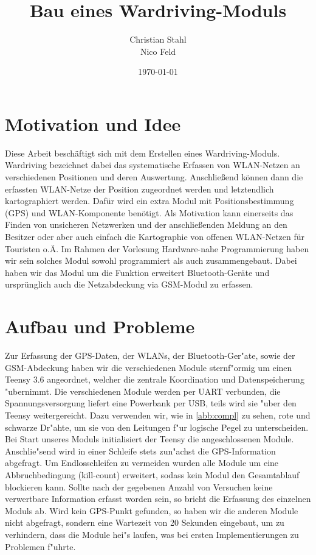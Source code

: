 \documentclass[a4paper,11pt, ngerman]{scrartcl}
\author{Christian Stahl\\Nico Feld}
\title{Bau eines Wardriving-Moduls}
\date{\today}
\begin{document}
\maketitle
\pagebreak
{}
\tableofcontents
\pagebreak
\section{Motivation und Idee}
Diese Arbeit beschäftigt sich mit dem Erstellen eines Wardriving-Moduls. \grqq Wardriving\grqq{} bezeichnet dabei das systematische Erfassen von WLAN-Netzen an verschiedenen Positionen und deren Auswertung. Anschließend können dann die erfassten WLAN-Netze der Position zugeordnet werden und letztendlich kartographiert werden. Dafür wird ein extra Modul mit Positionsbestimmung (GPS) und WLAN-Komponente benötigt. Als Motivation kann einerseits das Finden von unsicheren Netzwerken und der anschließenden Meldung an den Besitzer oder aber auch einfach die Kartographie von offenen WLAN-Netzen für Touristen o.Ä. Im Rahmen der Vorlesung \grqq Hardware-nahe Programmierung\grqq{} haben wir sein solches Modul sowohl programmiert als auch zusammengebaut. Dabei haben wir das Modul um die Funktion erweitert Bluetooth-Geräte und ursprünglich auch die Netzabdeckung via GSM-Modul zu erfassen.
\section{Aufbau und Probleme}
Zur Erfassung der GPS-Daten, der WLANs, der Bluetooth-Ger"ate, sowie der GSM-Abdeckung haben wir die verschiedenen Module sternf"ormig um einen Teensy 3.6 angeordnet, welcher die zentrale Koordination und Datenspeicherung "ubernimmt. Die verschiedenen Module werden per UART verbunden, die Spannungsversorgung liefert eine Powerbank per USB, teils wird sie "uber den Teensy weitergereicht. Dazu verwenden wir, wie in \cref{abb:compl} zu sehen, rote und schwarze Dr"ahte, um sie von den Leitungen f"ur logische Pegel zu unterscheiden.\\
Bei Start unseres Moduls initialisiert der Teensy die angeschlossenen Module. Anschlie"send wird in einer Schleife stets zun"achst die GPS-Information abgefragt. Um Endlosschleifen zu vermeiden wurden alle Module um eine Abbruchbedingung (kill-count) erweitert, sodass kein Modul den Gesamtablauf blockieren kann. Sollte nach der gegebenen Anzahl von Versuchen keine verwertbare Information erfasst worden sein, so bricht die Erfassung des einzelnen Moduls ab. Wird kein GPS-Punkt gefunden, so haben wir die anderen Module nicht abgefragt, sondern eine Wartezeit von 20 Sekunden eingebaut, um zu verhindern, dass die Module hei"s laufen, was bei ersten Implementierungen zu Problemen f"uhrte.
\end{document}
